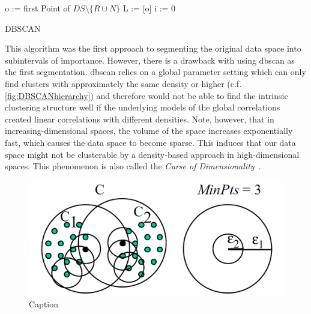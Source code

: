 \vspace{5mm}
\begin{algorithm}[H]
\SetAlgoLined
{}
 o := first Point of $DS\setminus \{R \cup N\}$\;
 L := [o]\;
 i := 0\;
 \caption{DBSCAN}
\end{algorithm}
\vspace{5mm}

This algorithm was the first approach to segmenting the original data space into subintervals of importance. However, there is a drawback with using \gls{dbscan} as the first segmentation. \gls{dbscan} relies on a global parameter setting which can only find clusters with approximately the same density or higher (c.f. \autoref{fig:DBSCANhierarchy}) and therefore would not be able to find the intrinsic clustering structure well if the underlying models of the global correlations created linear correlations with different densities. 
Note, however, that in increasing-dimensional spaces, the volume of the space increases exponentially fast, which causes the data space to become sparse. This induces that our data space might not be clusterable by a density-based approach in high-dimensional spaces. This phenomenon is also called the \textit{Curse of Dimensionality}~\cite{bellman2015adaptive}.

\begin{figure}
    \centering
    \includegraphics[width=.5\textwidth]{figures/DBSCANleastdensity.png}
    \caption{Caption ~\cite{opticsankerst1999optics}}
    \label{fig:DBSCANhierarchy}
\end{figure}

